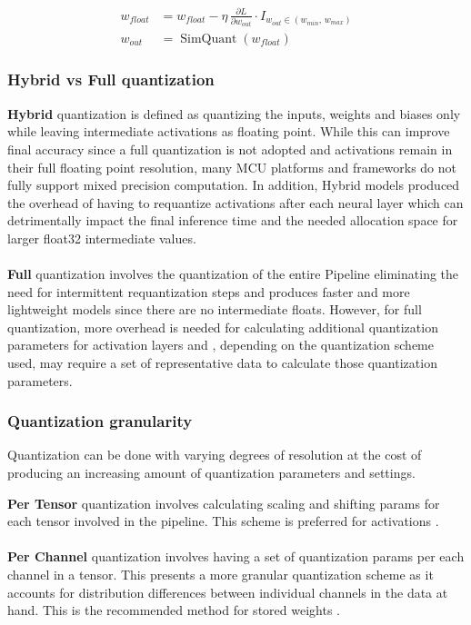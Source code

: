 \documentclass[12pt,DIV16,BCOR12mm,a4paper,footinclude=false,headinclude,parskip=half-,twoside,openright,cleardoublepage=empty,toc=index,bibliography=totoc,listof=totoc]{scrreprt}
\numberwithin{equation}{chapter}
\begin{document}
    \begin{equation}
    \begin{aligned}
        w_{float} &= w_{float} - \eta\,\frac{\partial L}{\partial w_{out}}\cdot I_{w_{out}\in(w_{min},\,w_{max})} \\
        w_{out} &= \operatorname{SimQuant}(w_{float})
    \end{aligned}
    \end{equation}
    
    \subsubsection{Hybrid vs Full quantization}
    \textbf{Hybrid} quantization is defined as quantizing the inputs, weights and biases only while leaving intermediate activations
    as floating point. While this can improve final accuracy since a full quantization is not adopted and activations remain in their full floating point
    resolution, many MCU platforms and frameworks do not fully support mixed precision computation. In addition, Hybrid models produced the overhead of having
    to requantize activations after each neural layer which can detrimentally impact the final inference time and the needed allocation space for larger float32 intermediate
    values.
    \\\\
    \textbf{Full} quantization involves the quantization of the entire Pipeline eliminating the need for intermittent requantization steps and produces faster
    and more lightweight models since there are no intermediate floats. However, for full quantization, more overhead is needed for calculating additional quantization
    parameters for activation layers and , depending on the quantization scheme used, may require a set of representative data to calculate those quantization parameters.
    
    \subsubsection{Quantization granularity}
    Quantization can be done with varying degrees of resolution at the cost of producing an increasing amount of quantization parameters and settings.

    \textbf{Per Tensor} quantization involves calculating scaling and shifting params for each tensor involved in the pipeline. 
    This scheme is preferred for activations \cite{krishnamoorthiQuantizingDeepConvolutional2018}.
    \\\\
    \textbf{Per Channel} quantization involves having a set of quantization params per each channel in a tensor. This presents
    a more granular quantization scheme as it accounts for distribution differences between individual channels in the data at hand.
    This is the recommended method for stored weights \cite{krishnamoorthiQuantizingDeepConvolutional2018,nagelWhitePaperNeural2021}.
  
\end{document}

